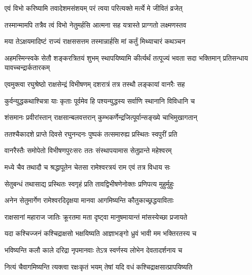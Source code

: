
\twolineshloka
{एवं विभो करिष्यामि तवादेशमसंशयम्}
{परं त्वया परित्यक्ते मर्त्ये मे जीवितं व्रजेत्}%

\twolineshloka
{तस्मान्मामपि तत्रैव त्वं विभो नेतुमर्हसि}
{आत्मना सह यत्रास्ते प्राग्गतो लक्ष्मणस्तव}%


\twolineshloka
{मया तेऽक्षयमादिष्टं राज्यं राक्षससत्तम}
{तस्मान्नार्हसि मां कर्तुं मिथ्याचारं कथञ्चन}%

\threelineshloka
{अहमस्मिन्स्वके सेतौ शङ्करत्रितयं शुभम्}
{स्थापयिष्यामि कीर्त्यर्थं तत्पूज्यं भवता सदा}
{भक्तिमान् प्रतिसन्धाय यावच्चन्द्रार्कतारकम्}%

\twolineshloka
{एवमुक्त्वा रघुश्रेष्ठो राक्षसेन्द्रं विभीषणम्}
{दशरात्रं तत्र तस्थौ लङ्कायां वानरैः सह}%

\twolineshloka
{कुर्वन्युद्धकथाश्चित्रा याः कृताः पूर्वमेव हि}
{पश्यन्युद्धस्य सर्वाणि स्थानानि विविधानि च}%

\twolineshloka
{शंसमानः प्रवीरांस्तान् राक्षसान्बलवत्तरान्}
{कुम्भकर्णेन्द्रजित्पूर्वान्सङ्ख्ये चाभिमुखागतान्}%

\twolineshloka
{ततश्चैकादशे प्राप्ते दिवसे रघुनन्दनः}
{पुष्पकं तत्समारुह्य प्रस्थितः स्वपुरीं प्रति}%

\twolineshloka
{वानरैस्तैः समोपेतो विभीषणपुरःसरः}
{ततः संस्थापयामास सेतुप्रान्ते महेश्वरम्}%

\twolineshloka
{मध्ये चैव तथादौ च श्रद्धापूतेन चेतसा}
{रामेश्वरत्रयं राम एवं तत्र विधाय सः}%

\twolineshloka
{सेतुबन्धं तथासाद्य प्रस्थितः स्वगृहं प्रति}
{तावद्विभीषणेनोक्तः प्रणिपत्य मुहुर्मुहुः}%


\twolineshloka
{अनेन सेतुमार्गेण रामेश्वरदिदृक्षया}
{मानवा आगमिष्यन्ति कौतुकाच्छ्रद्धयाविताः}%

\twolineshloka
{राक्षसानां महाराज जातिः क्रूरतमा मता}
{दृष्ट्वा मानुषमायान्तं मांसस्येच्छा प्रजायते}%

\twolineshloka
{यदा कश्चिज्जनं कश्चिद्राक्षसो भक्षयिष्यति}
{आज्ञाभङ्गो ध्रुवं भावी मम भक्तिरतस्य च}%

\twolineshloka
{भविष्यन्ति कलौ काले दरिद्रा नृपमानवाः}
{तेऽत्र स्वर्णस्य लोभेन देवतादर्शनाय च}%

\twolineshloka
{नित्यं चैवागमिष्यन्ति त्यक्त्वा रक्षःकृतं भयम्}
{तेषां यदि वधं कश्चिद्राक्षसात्प्रापयिष्यति}%

